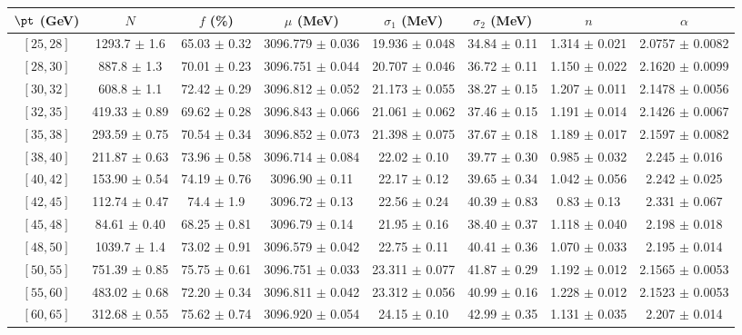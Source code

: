 \begin{tabular}{c||c|c|c|c|c|c|c}
$\pt$ (GeV) & $N$ & $f$ (\%) & $\mu$ (MeV) & $\sigma_1$ (MeV) & $\sigma_2$ (MeV) & $n$ & $\alpha$ \\
\hline
$[25, 28]$ & 1293.7 $\pm$ 1.6 & 65.03 $\pm$ 0.32 & 3096.779 $\pm$ 0.036 & 19.936 $\pm$ 0.048 & 34.84 $\pm$ 0.11 & 1.314 $\pm$ 0.021 & 2.0757 $\pm$ 0.0082\\
$[28, 30]$ & 887.8 $\pm$ 1.3 & 70.01 $\pm$ 0.23 & 3096.751 $\pm$ 0.044 & 20.707 $\pm$ 0.046 & 36.72 $\pm$ 0.11 & 1.150 $\pm$ 0.022 & 2.1620 $\pm$ 0.0099\\
$[30, 32]$ & 608.8 $\pm$ 1.1 & 72.42 $\pm$ 0.29 & 3096.812 $\pm$ 0.052 & 21.173 $\pm$ 0.055 & 38.27 $\pm$ 0.15 & 1.207 $\pm$ 0.011 & 2.1478 $\pm$ 0.0056\\
$[32, 35]$ & 419.33 $\pm$ 0.89 & 69.62 $\pm$ 0.28 & 3096.843 $\pm$ 0.066 & 21.061 $\pm$ 0.062 & 37.46 $\pm$ 0.15 & 1.191 $\pm$ 0.014 & 2.1426 $\pm$ 0.0067\\
$[35, 38]$ & 293.59 $\pm$ 0.75 & 70.54 $\pm$ 0.34 & 3096.852 $\pm$ 0.073 & 21.398 $\pm$ 0.075 & 37.67 $\pm$ 0.18 & 1.189 $\pm$ 0.017 & 2.1597 $\pm$ 0.0082\\
$[38, 40]$ & 211.87 $\pm$ 0.63 & 73.96 $\pm$ 0.58 & 3096.714 $\pm$ 0.084 & 22.02 $\pm$ 0.10 & 39.77 $\pm$ 0.30 & 0.985 $\pm$ 0.032 & 2.245 $\pm$ 0.016\\
$[40, 42]$ & 153.90 $\pm$ 0.54 & 74.19 $\pm$ 0.76 & 3096.90 $\pm$ 0.11 & 22.17 $\pm$ 0.12 & 39.65 $\pm$ 0.34 & 1.042 $\pm$ 0.056 & 2.242 $\pm$ 0.025\\
$[42, 45]$ & 112.74 $\pm$ 0.47 & 74.4 $\pm$ 1.9 & 3096.72 $\pm$ 0.13 & 22.56 $\pm$ 0.24 & 40.39 $\pm$ 0.83 & 0.83 $\pm$ 0.13 & 2.331 $\pm$ 0.067\\
$[45, 48]$ & 84.61 $\pm$ 0.40 & 68.25 $\pm$ 0.81 & 3096.79 $\pm$ 0.14 & 21.95 $\pm$ 0.16 & 38.40 $\pm$ 0.37 & 1.118 $\pm$ 0.040 & 2.198 $\pm$ 0.018\\
$[48, 50]$ & 1039.7 $\pm$ 1.4 & 73.02 $\pm$ 0.91 & 3096.579 $\pm$ 0.042 & 22.75 $\pm$ 0.11 & 40.41 $\pm$ 0.36 & 1.070 $\pm$ 0.033 & 2.195 $\pm$ 0.014\\
$[50, 55]$ & 751.39 $\pm$ 0.85 & 75.75 $\pm$ 0.61 & 3096.751 $\pm$ 0.033 & 23.311 $\pm$ 0.077 & 41.87 $\pm$ 0.29 & 1.192 $\pm$ 0.012 & 2.1565 $\pm$ 0.0053\\
$[55, 60]$ & 483.02 $\pm$ 0.68 & 72.20 $\pm$ 0.34 & 3096.811 $\pm$ 0.042 & 23.312 $\pm$ 0.056 & 40.99 $\pm$ 0.16 & 1.228 $\pm$ 0.012 & 2.1523 $\pm$ 0.0053\\
$[60, 65]$ & 312.68 $\pm$ 0.55 & 75.62 $\pm$ 0.74 & 3096.920 $\pm$ 0.054 & 24.15 $\pm$ 0.10 & 42.99 $\pm$ 0.35 & 1.131 $\pm$ 0.035 & 2.207 $\pm$ 0.014\\

\end{tabular}
